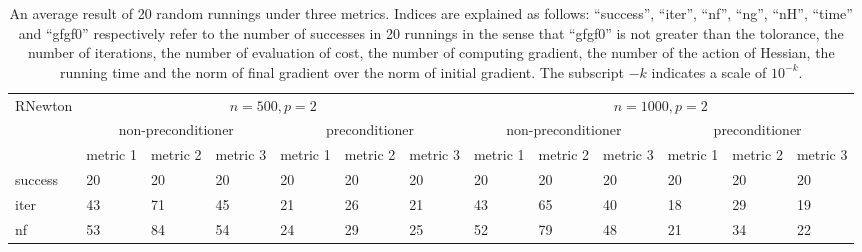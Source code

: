 \documentclass[11pt]{article}
\numberwithin{equation}{section}
\begin{document}
\begin{table}[htbp]
\caption{An average result of 20 random runnings under three metrics. Indices are explained as follows: ``success'', ``iter'', ``nf'', ``ng'', ``nH'', ``time'' and ``gfgf0'' respectively refer to the number of successes in 20 runnings in the sense that ``gfgf0'' is not greater than the tolorance, the number of iterations, the number of evaluation of cost, the number of computing gradient, the number of the action of Hessian, the running time and the norm of final gradient over the norm of initial gradient. The subscript $-k$ indicates a scale of $10^{-k}$.}	
\centering 
\setlength{\tabcolsep}{1.1pt}
{\scriptsize
\begin{tabular}{l|l|l|l|l|l|l|l|l|l|l|l|l} \hline \multicolumn{1}{l|}{\multirow{3}{*}{RNewton}} & \multicolumn{6}{c|}{$n=500, p=2$}                                                                                                                                                             & \multicolumn{6}{c}{$n=1000,p=2$}                                                                                                                                                              \\ \cline{2-13} 
\multicolumn{1}{l|}{}                        & \multicolumn{3}{c|}{non-preconditioner}                                                       & \multicolumn{3}{c|}{preconditioner}                                                           & \multicolumn{3}{c|}{non-preconditioner}                                                       & \multicolumn{3}{c}{preconditioner}                                                            \\ \cline{2-13} 
\multicolumn{1}{l|}{}                        & \multicolumn{1}{l|}{metric 1} & \multicolumn{1}{l|}{metric 2} & \multicolumn{1}{l|}{metric 3} & \multicolumn{1}{l|}{metric 1} & \multicolumn{1}{l|}{metric 2} & \multicolumn{1}{l|}{metric 3} & \multicolumn{1}{l|}{metric 1} & \multicolumn{1}{l|}{metric 2} & \multicolumn{1}{l|}{metric 3} & \multicolumn{1}{l|}{metric 1} & \multicolumn{1}{l|}{metric 2} & \multicolumn{1}{l}{metric 3} \\ \hline
 success &      20 &      20 &      20 &      20 &      20 &      20 &      20 &      20 &      20 &      20 &      20 &      20 \\ 
    iter &      43 &      71 &      45 &      21 &      26 &      21 &      43 &      65 &      40 &      18 &      29 &      19 \\ 
      nf &      53 &      84 &      54 &      24 &      29 &      25 &      52 &      79 &      48 &      21 &      34 &      22 \\ 

\end{tabular}}
\end{table}
\end{document}

